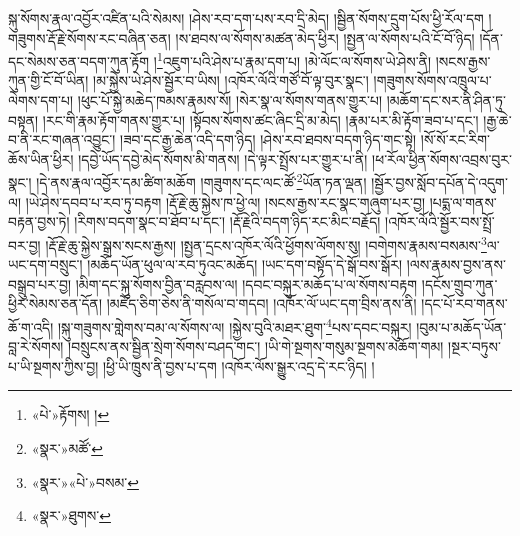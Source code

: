 སྐུ་སོགས་རྣལ་འབྱོར་འཛིན་པའི་སེམས། །ཤེས་རབ་དག་པས་རབ་དྲི་མེད། །སྦྱིན་སོགས་དྲུག་པོས་ཕྱི་རོལ་དག །གཟུགས་རྡོ་རྗེ་སོགས་རང་བཞིན་ཅན། །ས་ཐབས་ལ་སོགས་མཚན་མེད་ཕྱིར། །སྤྱན་ལ་སོགས་པའི་ངོ་བོ་ཉིད། །དོན་དང་སེམས་ཅན་བདག་ཀུན་རྟོག །\footnote{«པེ་»རྟོགས། །}འཇུག་པའི་ཤེས་པ་རྣམ་དག་པ། །མེ་ལོང་ལ་སོགས་ཡེ་ཤེས་ནི། །སངས་རྒྱས་ཀུན་གྱི་ངོ་བོ་ཡིན། །མ་སྐྱེས་ཡེ་ཤེས་སྦྱོར་བ་ཡིས། །འཁོར་ལོའི་གཙོ་བོ་ལྟ་བུར་སྣང་། །གཟུགས་སོགས་འཁྲུལ་པ་ལེགས་དག་པ། །ཕུང་པོ་སྐྱེ་མཆེད་ཁམས་རྣམས་སོ། །སེར་སྣ་ལ་སོགས་གནས་གྱུར་པ། །མཆོག་དང་སར་ནི་ཤིན་ཏུ་བསྟན། །རང་གི་རྣམ་རྟོག་གནས་གྱུར་པ། །སྟོབས་སོགས་ཚང་ཞིང་དྲི་མ་མེད། །རྣམ་པར་མི་རྟོག་ཟབ་པ་དང་། །རྒྱ་ཆེ་བ་ནི་རང་གཞན་འབྱུང་། །ཟབ་དང་རྒྱ་ཆེན་འདི་དག་ཉིད། །ཤེས་རབ་ཐབས་བདག་ཉིད་གང་སྟེ། །སོ་སོ་རང་རིག་ཆོས་ཡིན་ཕྱིར། །དབྱེ་ཡོད་དབྱེ་མེད་སོགས་མི་གནས། །དེ་ལྟར་སྤྲོས་པར་གྱུར་པ་ནི། །ཕ་རོལ་ཕྱིན་སོགས་འབྲས་བུར་སྣང་། །དེ་ནས་རྣལ་འབྱོར་དམ་ཚིག་མཆོག །གཟུགས་དང་ལང་ཚོ་\footnote{«སྣར་»མཚོ་}ཡོན་ཏན་ལྡན། །སྦྱོར་བྱས་སློབ་དཔོན་དེ་འདུག་ལ། །ཡེ་ཤེས་དབབ་པ་རབ་ཏུ་བརྟག །རྡོ་རྗེ་ཆུ་སྐྱེས་ཁ་ཕྱེ་ལ། །སངས་རྒྱས་རང་སྣང་གཞུག་པར་བྱ། །པདྨ་ལ་གནས་བརྟན་བྱས་ཏེ། །རིགས་བདག་སྣང་བ་ཐོབ་པ་དང་། །རྡོ་རྗེའི་བདག་ཉིད་རང་མིང་བརྗོད། །འཁོར་ལོའི་སྦྱོར་བས་སྤྲོ་བར་བྱ། །རྡོ་རྗེ་ཆུ་སྐྱེས་སྒྲས་སངས་རྒྱས། །སྤྱན་དྲངས་འཁོར་ལོའི་ཕྱོགས་ལོགས་སུ། །བགེགས་རྣམས་བསམས་\footnote{«སྣར་»«པེ་»བསམ་}ལ་ཡང་དག་བསྲུང་། །མཆོད་ཡོན་ཕུལ་ལ་རབ་ཏུའང་མཆོད། །ཡང་དག་བསྟོད་དེ་སྒོ་བས་སྒོར། །ལས་རྣམས་བྱས་ནས་བསྒྲུབ་པར་བྱ། །མིག་དང་སྐུ་སོགས་བྱིན་བརླབས་ལ། །དབང་བསྐུར་མཆོད་པ་ལ་སོགས་བརྟག །དངོས་གྲུབ་ཀུན་ཕྱིར་སེམས་ཅན་དོན། །མཛོད་ཅིག་ཅེས་ནི་གསོལ་བ་གདབ། །འཁོར་ལོ་ཡང་དག་བྲིས་ནས་ནི། །དང་པོ་རབ་གནས་ཆོ་ག་འདི། །སྐུ་གཟུགས་གླེགས་བམ་ལ་སོགས་ལ། །སྐྱེས་བུའི་མཐར་ཐུག་\footnote{«སྣར་»ཐུགས་}པས་དབང་བསྐུར། །བུམ་པ་མཆོད་ཡོན་བླ་རེ་སོགས། །བསྲུངས་ནས་སྦྱིན་སྲེག་སོགས་བཤད་གང་། །ཡི་གེ་སྔགས་གསུམ་སྔགས་མཆོག་གམ། །སྔར་བཏུས་པ་ཡི་སྔགས་ཀྱིས་བྱ། །ཕྱི་ཡི་ཁྲུས་ནི་བྱས་པ་དག །འཁོར་ལོས་སྒྱུར་འདྲ་དེ་རང་ཉིད། །
